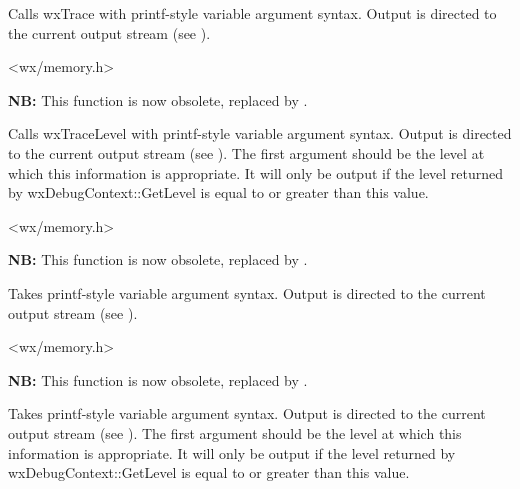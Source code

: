 Calls wxTrace with printf-style variable argument syntax. Output
is directed to the current output stream (see ).


<wx/memory.h>


\label{tracelevel}


{\bf NB:} This function is now obsolete, replaced by .

Calls wxTraceLevel with printf-style variable argument syntax. Output
is directed to the current output stream (see ).
The first argument should be the level at which this information is appropriate.
It will only be output if the level returned by wxDebugContext::GetLevel is equal to or greater than
this value.


<wx/memory.h>


\label{wxtrace}


{\bf NB:} This function is now obsolete, replaced by .

Takes printf-style variable argument syntax. Output
is directed to the current output stream (see ).


<wx/memory.h>


\label{wxtracelevel}


{\bf NB:} This function is now obsolete, replaced by .

Takes printf-style variable argument syntax. Output
is directed to the current output stream (see ).
The first argument should be the level at which this information is appropriate.
It will only be output if the level returned by wxDebugContext::GetLevel is equal to or greater than
this value.



